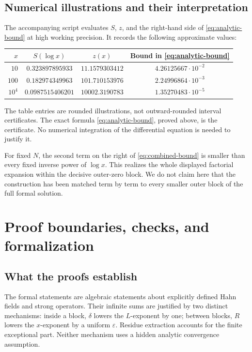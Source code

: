 \documentclass[11pt,a4paper]{article}
\numberwithin{equation}{section}
\theoremstyle{definition}
\theoremstyle{remark}
\newcommand{\eps}{\varepsilon}
\begin{document}
\subsection{Numerical illustrations and their interpretation}
The accompanying script evaluates $S$, $z$, and the right-hand side of \eqref{eq:analytic-bound} at high working precision. It records the following approximate values:
\begin{center}
\begin{tabular}{rccc}
\toprule
$x$ & $S(\log x)$ & $z(x)$ & Bound in \eqref{eq:analytic-bound}\\
\midrule
$10$ & $0.323897895933$ & $11.1579303412$ & $4.26125667\cdot10^{-2}$\\
$100$ & $0.182974349963$ & $101.710153976$ & $2.24996864\cdot10^{-3}$\\
$10^4$ & $0.0987515406201$ & $10002.3190783$ & $1.35270483\cdot10^{-5}$\\
\bottomrule
\end{tabular}
\end{center}
The table entries are rounded illustrations, not outward-rounded interval certificates. The exact formula \eqref{eq:analytic-bound}, proved above, is the certificate. No numerical integration of the differential equation is needed to justify it.

For fixed $N$, the second term on the right of \eqref{eq:combined-bound} is smaller than every fixed inverse power of $\log x$. This realizes the whole displayed factorial expansion within the decisive outer-zero block. We do not claim here that the construction has been matched term by term to every smaller outer block of the full formal solution.

\section{Proof boundaries, checks, and formalization}
\label{sec:verification}

\subsection{What the proofs establish}
The formal statements are algebraic statements about explicitly defined Hahn fields and strong operators. Their infinite sums are justified by two distinct mechanisms: inside a block, $\delta$ lowers the $L$-exponent by one; between blocks, $R$ lowers the $x$-exponent by a uniform $\eps$. Residue extraction accounts for the finite exceptional part. Neither mechanism uses a hidden analytic convergence assumption.
\end{document}
